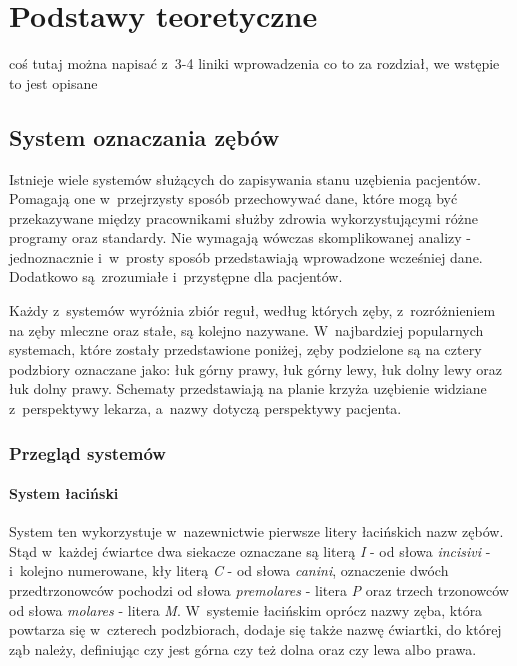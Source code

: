 
\chapter{Podstawy teoretyczne}

coś tutaj można napisać z~3-4 liniki wprowadzenia co to za rozdział, we wstępie to jest opisane
 
\section{System oznaczania zębów}

Istnieje wiele systemów służących do zapisywania stanu uzębienia pacjentów. Pomagają one w~przejrzysty sposób przechowywać dane, które mogą być przekazywane między pracownikami służby zdrowia wykorzystującymi różne programy oraz standardy. Nie wymagają wówczas skomplikowanej analizy - jednoznacznie i~w~prosty sposób przedstawiają wprowadzone wcześniej dane. Dodatkowo są~zrozumiałe i~przystępne dla pacjentów.

Każdy z~systemów wyróżnia zbiór reguł, według których zęby, z~rozróżnieniem na zęby mleczne oraz stałe, są kolejno nazywane. W~najbardziej popularnych systemach, które zostały przedstawione poniżej, zęby podzielone są na cztery podzbiory oznaczane jako: łuk górny prawy, łuk górny lewy, łuk dolny lewy oraz łuk dolny prawy. Schematy przedstawiają na planie krzyża uzębienie widziane z~perspektywy lekarza, a~nazwy dotyczą perspektywy pacjenta.

\subsection{Przegląd systemów}
\subsubsection{System łaciński}

\renewcommand*{\tablename}{Schemat}

System ten wykorzystuje w~nazewnictwie pierwsze litery łacińskich nazw zębów. Stąd w~każdej ćwiartce dwa siekacze oznaczane są literą \textit{I} - od słowa \textit{incisivi} - i~kolejno numerowane, kły literą \textit{C} - od słowa \textit{canini}, oznaczenie dwóch przedtrzonowców pochodzi od słowa \textit{premolares} - litera \textit{P} oraz trzech trzonowców od słowa \textit{molares} - litera \textit{M}. W~systemie łacińskim oprócz nazwy zęba, która powtarza się w~czterech podzbiorach, dodaje się także nazwę ćwiartki, do której ząb należy, definiując czy jest górna czy też dolna oraz czy lewa albo prawa.\\

